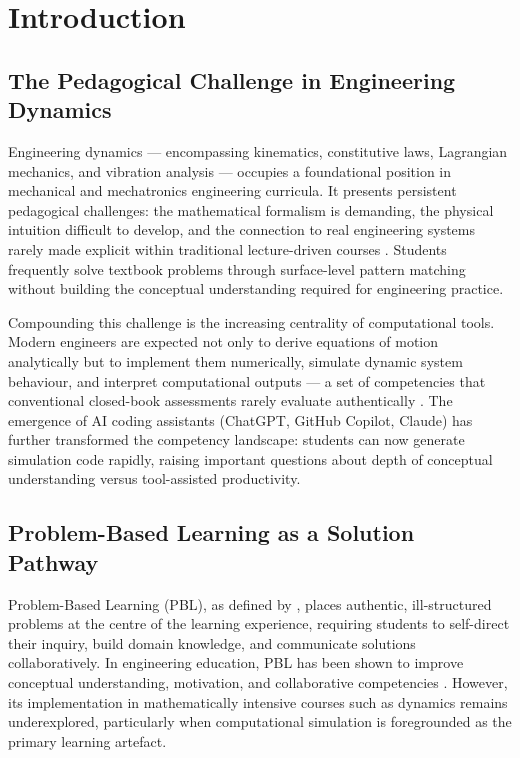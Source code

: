 \documentclass[12pt, a4paper]{article}
\begin{document}
\newpage

\section{Introduction}

\subsection{The Pedagogical Challenge in Engineering Dynamics}

Engineering dynamics --- encompassing kinematics, constitutive
laws, Lagrangian mechanics, and vibration analysis --- occupies a
foundational position in mechanical and mechatronics engineering
curricula. It presents persistent pedagogical challenges: the
mathematical formalism is demanding, the physical intuition
difficult to develop, and the connection to real engineering
systems rarely made explicit within traditional lecture-driven
courses \citep{streveler2008learning}. Students frequently solve
textbook problems through surface-level pattern matching without
building the conceptual understanding required for engineering
practice.

Compounding this challenge is the increasing centrality of
computational tools. Modern engineers are expected not only to
derive equations of motion analytically but to implement them
numerically, simulate dynamic system behaviour, and interpret
computational outputs --- a set of competencies that conventional
closed-book assessments rarely evaluate authentically
\citep{justo2021enhancing}. The emergence of AI coding assistants
(ChatGPT, GitHub Copilot, Claude) has further transformed the
competency landscape: students can now generate simulation code
rapidly, raising important questions about depth of conceptual
understanding versus tool-assisted productivity.

\subsection{Problem-Based Learning as a Solution Pathway}

Problem-Based Learning (PBL), as defined by
\citet{hmelo2004problem}, places authentic, ill-structured problems
at the centre of the learning experience, requiring students to
self-direct their inquiry, build domain knowledge, and communicate
solutions collaboratively. In engineering education, PBL has been
shown to improve conceptual understanding, motivation, and
collaborative competencies \citep{prince2006inductive,
dym2005engineering}. However, its implementation in mathematically
intensive courses such as dynamics remains underexplored,
particularly when computational simulation is foregrounded as the
primary learning artefact.
\end{document}
